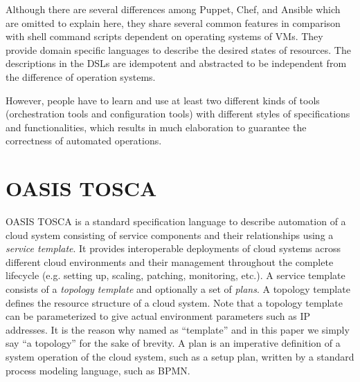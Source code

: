 \documentclass[12pt]{report}
\begin{document}
Although there are several differences among Puppet, Chef, and Ansible
which are omitted to explain here, they share several common features in
comparison with shell command scripts dependent on operating systems
of VMs. They provide domain specific languages to describe the
desired states of resources. The descriptions in the DSLs are
idempotent and abstracted to be independent from the difference of
operation systems.

However, people have to learn and use at least two different kinds of
tools (orchestration tools and configuration tools) with different
styles of specifications and functionalities, which results in much
elaboration to guarantee the correctness of automated operations.

\section{OASIS TOSCA}
\label{sec:TOSCA}
OASIS TOSCA\cite{TOSCA} is a standard specification language to
describe automation of a cloud system consisting of service components
and their relationships using a {\it service template}. It provides
interoperable deployments of cloud systems across different cloud
environments and their management throughout the complete lifecycle
(e.g. setting up, scaling, patching, monitoring, etc.).  A service
template consists of a {\it topology template} and optionally a set of
{\it plans}. A topology template defines the resource structure of a
cloud system. Note that a topology template can be parameterized to
give actual environment parameters such as IP addresses. It is the
reason why named as ``template'' and in this paper we simply say ``a
topology'' for the sake of brevity. A plan is an imperative definition
of a system operation of the cloud system, such as a setup plan,
written by a standard process modeling language, such as BPMN.
\end{document}
